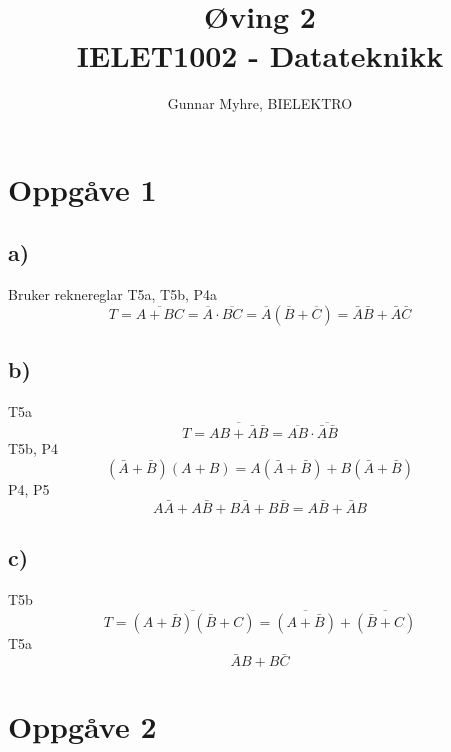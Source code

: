 \documentclass[12pt,a4paper]{article}
\title{%
  Øving 2 \\
  \large IELET1002 - Datateknikk \\
  }
\author{Gunnar Myhre, BIELEKTRO}
\newcommand{\N}{\overline}
\begin{document}
  \maketitle
    
  \section{Oppgåve 1}
    \subsection{a)}
      Bruker reknereglar T5a, T5b, P4a
      \begin{equation}
        T=\N{A + BC}=\N{A}\cdot\N{BC}=\N{A}(\N{B}+\N{C})
        = \bar{A}\bar{B} + \bar{A}\bar{C}
      \end{equation}
    \subsection{b)}
      T5a
      \begin{equation}
        T=\N{AB+\bar{A}\bar{B}} = \N{AB} \cdot \N{\bar{A}\bar{B}}
      \end{equation}
      T5b, P4
      \begin{equation}
        (\bar{A}+\bar{B})(A+B) = A(\bar{A}+\bar{B}) + B(\bar{A}+\bar{B})
      \end{equation}
      P4, P5
      \begin{equation}
        A\bar{A}+A\bar{B}+B\bar{A}+B\bar{B} = A\bar{B} + \bar{A}B
      \end{equation}
    \subsection{c)}
      T5b
      \begin{equation}
        T=\N{(A+\bar{B})(\bar{B}+C)} = \N{(A+\bar{B})}+\N{(\bar{B}+C)}
      \end{equation}
      T5a
      \begin{equation}
        \bar{A}B+B\bar{C}
      \end{equation}
    
  \section{Oppgåve 2}
\end{document}
